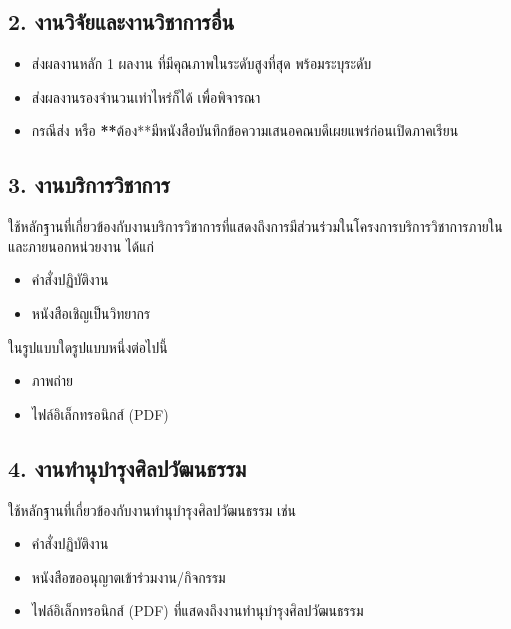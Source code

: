 \documentclass[a4paper,12pt,english]{sphinxmanual}
\begin{document}
\subsection{2. งานวิจัยและงานวิชาการอื่น}
\label{\detokenize{submission_part1:id6}}\begin{itemize}
\item {} 
ส่งผลงานหลัก 1 ผลงาน ที่มีคุณภาพในระดับสูงที่สุด พร้อมระบุระดับ

\item {} 
ส่งผลงานรองจำนวนเท่าไหร่ก็ได้ เพื่อพิจารณา

\item {} 
กรณีส่ง {\hyperref[\detokenize{glossary:term-0}]{}} หรือ {\hyperref[\detokenize{glossary:term-1}]{}} {\color{red}\bfseries{}**}ต้อง**มีหนังสือบันทึกข้อความเสนอคณบดีเผยแพร่ก่อนเปิดภาคเรียน

\end{itemize}


\subsection{3. งานบริการวิชาการ}
\label{\detokenize{submission_part1:id9}}
ใช้หลักฐานที่เกี่ยวข้องกับงานบริการวิชาการที่แสดงถึงการมีส่วนร่วมในโครงการบริการวิชาการภายในและภายนอกหน่วยงาน ได้แก่
\begin{itemize}
\item {} 
คำสั่งปฏิบัติงาน

\item {} 
หนังสือเชิญเป็นวิทยากร

\end{itemize}

ในรูปแบบใดรูปแบบหนึ่งต่อไปนี้
\begin{itemize}
\item {} 
ภาพถ่าย

\item {} 
ไฟล์อิเล็กทรอนิกส์ (PDF)

\end{itemize}


\subsection{4. งานทำนุบำรุงศิลปวัฒนธรรม}
\label{\detokenize{submission_part1:id10}}
ใช้หลักฐานที่เกี่ยวข้องกับงานทำนุบำรุงศิลปวัฒนธรรม เช่น
\begin{itemize}
\item {} 
คำสั่งปฏิบัติงาน

\item {} 
หนังสือขออนุญาตเข้าร่วมงาน/กิจกรรม

\item {} 
ไฟล์อิเล็กทรอนิกส์ (PDF) ที่แสดงถึงงานทำนุบำรุงศิลปวัฒนธรรม

\end{itemize}
\end{document}

